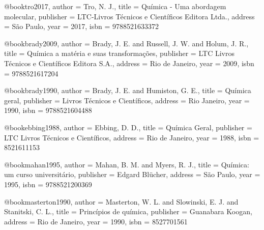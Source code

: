 @book{tro2017,
  author = {Tro, N. J.},
  title = {Química - Uma abordagem molecular},
  publisher = {LTC-Livros Técnicos e Científicos Editora Ltda.},
  address = {São Paulo},
  year = {2017},
  isbn = {9788521633372}%
}

@book{brady2009,
  author = {Brady, J. E. and Russell, J. W. and Holum, J. R.},
  title = {Química a matéria e suas transformações},
  publisher = {LTC Livros Técnicos e Científicos Editora S.A.},
  address = {Rio de Janeiro},
  year = {2009},
  isbn = {9788521617204}%
}

@book{brady1990,
  author = {Brady, J. E. and Humiston, G. E.},
  title = {Química geral},
  publisher = {Livros Técnicos e Científicos},
  address = {Rio Janeiro},
  year = {1990},
  isbn = {9788521604488}%
}

@book{ebbing1988,
  author = {Ebbing, D. D.},
  title = {Química Geral},
  publisher = {LTC Livros Técnicos e Científicos},
  address = {Rio de Janeiro},
  year = {1988},
  isbn = {8521611153}%
}

@book{mahan1995,
  author = {Mahan, B. M. and Myers, R. J.},
  title = {Química: um curso universitário},
  publisher = {Edgard Blücher},
  address = {São Paulo},
  year = {1995},
  isbn = {9788521200369}
}

@book{masterton1990,
  author = {Masterton, W. L. and Slowinski, E. J. and Stanitski, C. L.},
  title = {Princípios de química},
  publisher = {Guanabara Koogan},
  address = {Rio de Janeiro},
  year = {1990},
  isbn = {8527701561}
}

